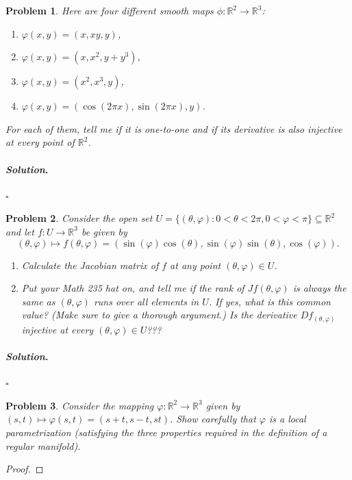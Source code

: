 \documentclass[reqno]{amsart}
\theoremstyle{plain}
\newtheorem{problem}{Problem}
\theoremstyle{definition}
\newenvironment{solution}{\paragraph{\emph{Solution}.}}{\hfill$\square$}
\begin{document}
\begin{problem}
Here are four different smooth maps $\phi:\mathbb{R}^{2} \rightarrow \mathbb{R}^{3}$:
\begin{enumerate}
\item $\varphi(x,y) = (x,xy,y)$,
\item $\varphi(x,y) = (x,x^{2},y + y^{3})$,
\item $\varphi(x,y) = (x^{2},x^{3},y)$,
\item $\varphi(x,y) = (\cos(2\pi x),\sin(2\pi x),y)$.
\end{enumerate}
For each of them, tell me if it is one-to-one and if its derivative is also injective at every point of $\mathbb{R}^{2}$.
\end{problem}
\begin{solution}

\end{solution}



\begin{problem}
Consider the open set $U = \{(\theta,\varphi): 0 < \theta < 2 \pi, 0 < \varphi < \pi \} \subseteq \mathbb{R}^{2}$ and let $f:U \rightarrow \mathbb{R}^{3}$ be given by
$$(\theta,\varphi) \mapsto f(\theta,\varphi) = (\sin(\varphi) \cos(\theta), \sin(\varphi) \sin(\theta), \cos(\varphi) ). $$
\begin{enumerate}
\item Calculate the Jacobian matrix of $f$ at any point $(\theta,\varphi) \in U$.
\item Put your Math 235 hat on, and tell me if the rank of $Jf(\theta,\varphi)$ is always the same as $(\theta,\varphi)$ runs over all elements in $U$.  If yes, what is this common value?  (Make sure to give a thorough argument.)  Is the derivative $Df_{(\theta,\varphi)}$ injective at every $(\theta,\varphi) \in U$???
\end{enumerate}
\end{problem}
\begin{solution}

\end{solution}




\begin{problem}
Consider the mapping $\varphi:\mathbb{R}^{2} \rightarrow \mathbb{R}^{3}$ given by $(s,t) \mapsto \varphi(s,t) = (s+t,s-t,st)$.  Show carefully that $\varphi$ is a local parametrization (satisfying the three properties required in the definition of a regular manifold).
\end{problem}
\begin{proof}

\end{proof}
\end{document}
